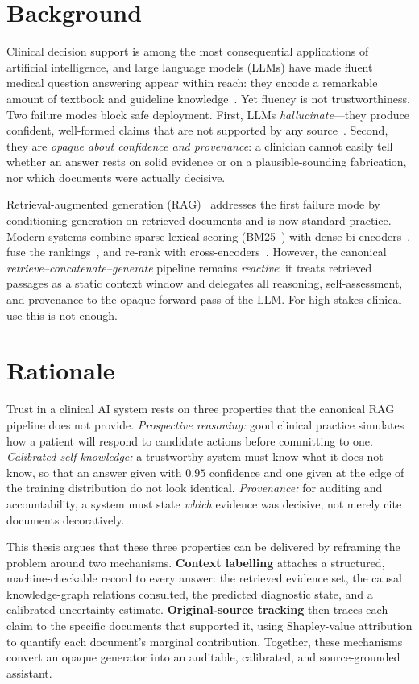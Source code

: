 \documentclass[11pt,a4paper]{report}
\begin{document}
\section{Background}
Clinical decision support is among the most consequential applications of
artificial intelligence, and large language models (LLMs) have made fluent
medical question answering appear within reach: they encode a remarkable amount
of textbook and guideline knowledge~\cite{singhal2023medpalm}. Yet fluency is
not trustworthiness. Two failure modes block safe deployment. First, LLMs
\emph{hallucinate}---they produce confident, well-formed claims that are not
supported by any source~\cite{ji2023hallucination}. Second, they are
\emph{opaque about confidence and provenance}: a clinician cannot easily tell
whether an answer rests on solid evidence or on a plausible-sounding
fabrication, nor which documents were actually decisive.

Retrieval-augmented generation (RAG)~\cite{lewis2020rag} addresses the first
failure mode by conditioning generation on retrieved documents and is now
standard practice. Modern systems combine sparse lexical scoring
(BM25~\cite{robertson2009bm25}) with dense
bi-encoders~\cite{reimers2019sbert}, fuse the rankings~\cite{cormack2009rrf},
and re-rank with cross-encoders~\cite{nogueira2019passage}. However, the
canonical \emph{retrieve--concatenate--generate} pipeline remains
\emph{reactive}: it treats retrieved passages as a static context window and
delegates all reasoning, self-assessment, and provenance to the opaque forward
pass of the LLM. For high-stakes clinical use this is not enough.

\section{Rationale}
Trust in a clinical AI system rests on three properties that the canonical RAG
pipeline does not provide. \emph{Prospective reasoning:} good clinical practice
simulates how a patient will respond to candidate actions before committing to
one. \emph{Calibrated self-knowledge:} a trustworthy system must know what it
does not know, so that an answer given with $0.95$ confidence and one given at
the edge of the training distribution do not look identical. \emph{Provenance:}
for auditing and accountability, a system must state \emph{which} evidence was
decisive, not merely cite documents decoratively.

This thesis argues that these three properties can be delivered by reframing the
problem around two mechanisms. \textbf{Context labelling} attaches a structured,
machine-checkable record to every answer: the retrieved evidence set, the
causal knowledge-graph relations consulted, the predicted diagnostic state, and
a calibrated uncertainty estimate. \textbf{Original-source tracking} then traces
each claim to the specific documents that supported it, using Shapley-value
attribution to quantify each document's marginal contribution. Together, these
mechanisms convert an opaque generator into an auditable, calibrated, and
source-grounded assistant.
\end{document}
